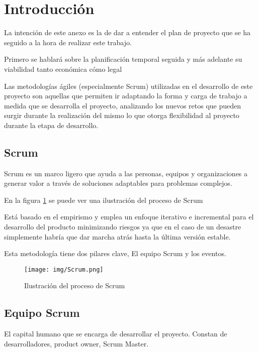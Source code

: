 
\section{Introducción}

La intención de este anexo es la de dar a entender el plan de proyecto que se ha seguido a la hora de realizar este trabajo.

Primero se hablará sobre la planificación temporal seguida y más adelante su viabilidad tanto económica cómo legal

Las metodologías ágiles (especialmente Scrum) utilizadas en el desarrollo de este proyecto son aquellas que permiten ir adaptando la forma y carga de trabajo a medida que se desarrolla el proyecto, analizando los nuevos retos que pueden surgir durante la realización del mismo lo que otorga flexibilidad al proyecto durante la etapa de desarrollo.\cite{gomez_aplicacion_2020}

\subsection{Scrum}

Scrum es un marco ligero que ayuda a las personas, equipos y organizaciones a generar valor a través de soluciones adaptables para problemas complejos.

En la figura \ref{fig:scrum} se puede ver una ilustración del proceso de Scrum

Está basado en el empirismo y emplea un enfoque iterativo e incremental para el desarrollo del producto minimizando riesgos ya que en el caso de un desastre simplemente habría que dar marcha atrás hasta la última versión estable.

Esta metodología tiene dos pilares clave, El equipo Scrum y los eventos.

\begin{figure}[!h]
    \centering
    \texttt{[image: img/Scrum.png]}
    \caption{Ilustración del proceso de Scrum}
    \label{fig:scrum}
\end{figure}

\subsection{Equipo Scrum}

El capital humano que se encarga de desarrollar el proyecto. Constan de desarrolladores, product owner, Scrum Master.

